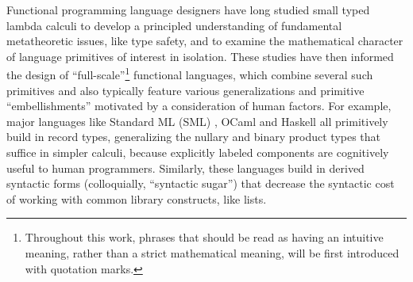 Functional programming language designers have long studied small typed lambda calculi to develop a principled understanding of  fundamental metatheoretic issues, like type safety, and to examine the mathematical character of language primitives of interest in isolation. These studies have then informed the design of ``full-scale''\footnote{Throughout this work, phrases that should be read as having an intuitive meaning, rather than a strict mathematical meaning, will be first introduced with quotation marks.} functional languages, which combine several such primitives and also typically feature various generalizations and primitive ``embellishments''  motivated by a consideration of human factors. 
For example, major languages like Standard ML (SML) \cite{mthm97-for-dart,harper1997programming}, OCaml \cite{ocaml-manual} and Haskell \cite{jones2003haskell} all primitively build in record types, generalizing the nullary and binary product types that suffice in simpler calculi, because explicitly labeled components are cognitively useful to human programmers. Similarly, these languages build in derived syntactic forms (colloquially, ``syntactic sugar'') that decrease the syntactic cost of  working with common library constructs, like lists.

